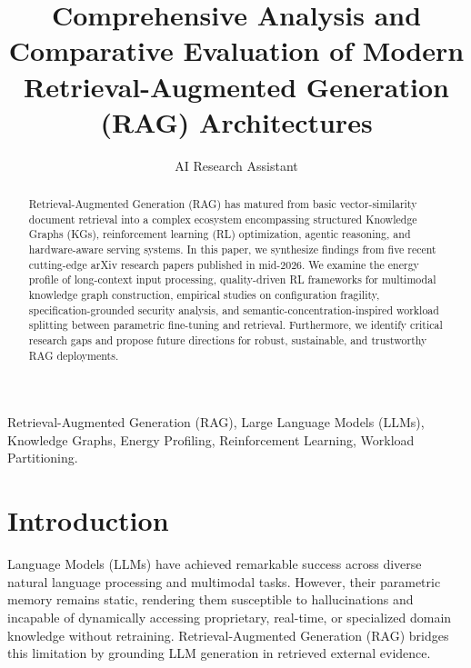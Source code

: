 \documentclass[10pt,journal,compsoc]{IEEEtran}
\begin{document}
\title{Comprehensive Analysis and Comparative Evaluation of Modern Retrieval-Augmented Generation (RAG) Architectures}

\author{AI Research Assistant}


\IEEEpubidadjcol

\maketitle

\begin{abstract}
Retrieval-Augmented Generation (RAG) has matured from basic vector-similarity document retrieval into a complex ecosystem encompassing structured Knowledge Graphs (KGs), reinforcement learning (RL) optimization, agentic reasoning, and hardware-aware serving systems. In this paper, we synthesize findings from five recent cutting-edge arXiv research papers published in mid-2026. We examine the energy profile of long-context input processing, quality-driven RL frameworks for multimodal knowledge graph construction, empirical studies on configuration fragility, specification-grounded security analysis, and semantic-concentration-inspired workload splitting between parametric fine-tuning and retrieval. Furthermore, we identify critical research gaps and propose future directions for robust, sustainable, and trustworthy RAG deployments.
\end{abstract}

\begin{IEEEkeywords}
Retrieval-Augmented Generation (RAG), Large Language Models (LLMs), Knowledge Graphs, Energy Profiling, Reinforcement Learning, Workload Partitioning.
\end{IEEEkeywords}

\section{Introduction}
 Language Models (LLMs) have achieved remarkable success across diverse natural language processing and multimodal tasks. However, their parametric memory remains static, rendering them susceptible to hallucinations and incapable of dynamically accessing proprietary, real-time, or specialized domain knowledge without retraining. Retrieval-Augmented Generation (RAG) bridges this limitation by grounding LLM generation in retrieved external evidence.
\end{document}

